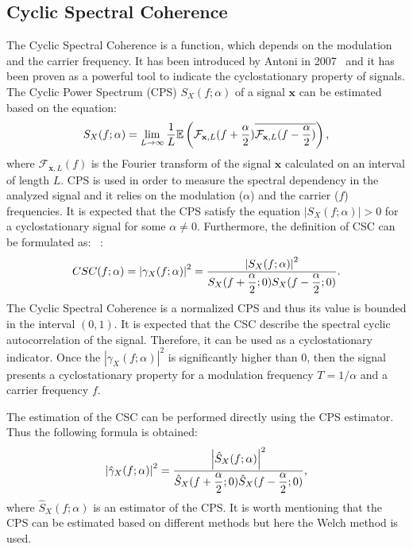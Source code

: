 \documentclass[11pt]{article}
\newcommand{\D}{\displaystyle}
\begin{document}
\subsection{Cyclic Spectral Coherence}
The Cyclic Spectral Coherence is a function, which depends on the modulation and the carrier frequency. It has been introduced by Antoni in 2007~\cite{antoni2007cyclic} and it has been proven as a powerful tool to indicate the cyclostationary property of signals.  The Cyclic Power Spectrum (CPS) $S_X(f;\alpha)$ of a signal $\mathbf{x}$ can be estimated based on the equation:
\begin{equation}
\label{eq:CPS}
S_X(f;\alpha)=\lim_{L\to \infty}\D{1\over L}\mathbb{E}\left(\mathcal{F}_{\mathbf{x},L}(f+\D{\alpha \over 2})\overline{\mathcal{F}_{\mathbf{x},L}(f-\D{\alpha \over 2})}\right),
\end{equation}
where $\mathcal{F}_{\mathbf{x},L}(f)$ is the Fourier transform of the signal $\mathbf{x}$ calculated on an interval of length $L$.
CPS is used in order to measure the spectral dependency in the analyzed signal and it relies on the modulation ($\alpha$) and the carrier ($f$) frequencies. It is expected that the CPS satisfy the equation $\left|S_X(f;\alpha)\right|>0$ for a cyclostationary signal for some $\alpha\neq 0$. Furthermore, the definition of CSC can be formulated as:
 ~\cite{antoni2007cyclic}:
\begin{equation}
\label{eq:SC}
CSC(f;\alpha)=\left|\gamma_X(f;\alpha)\right|^{2}=\D { \left|S_X(f;\alpha)\right|^2 \over S_X(f+\D{\alpha \over 2};0)S_X(f-\D{\alpha \over 2};0)}.
\end{equation}
The Cyclic Spectral Coherence is a normalized CPS and thus its value is bounded in the interval $(0,1)$. It is expected that the CSC describe the spectral cyclic autocorrelation of the signal. Therefore, it can be used as a cyclostationary indicator. Once the $\left|\gamma_X(f;\alpha)\right|^{2}$ is significantly higher than 0, then the signal presents a cyclostationary property for a modulation frequency $T=1/\alpha$ and a carrier frequency $f$.

The estimation of the CSC can be performed directly using the CPS estimator. Thus the following formula is obtained:
\begin{equation}
\left|\hat{\gamma}_X(f;\alpha)\right|^{2}=\D { \left|\hat{S}_X(f;\alpha)\right|^2 \over \hat{S}_X(f+\D{\alpha \over 2};0)\hat{S}_X(f-\D{\alpha \over 2};0)},
\end{equation} 
where $\hat{S}_X(f;\alpha)$ is an estimator of the CPS.
It is worth mentioning that the CPS can be estimated based on different methods\cite{antoni2007cyclic2} but here the Welch method is used.
\end{document}
